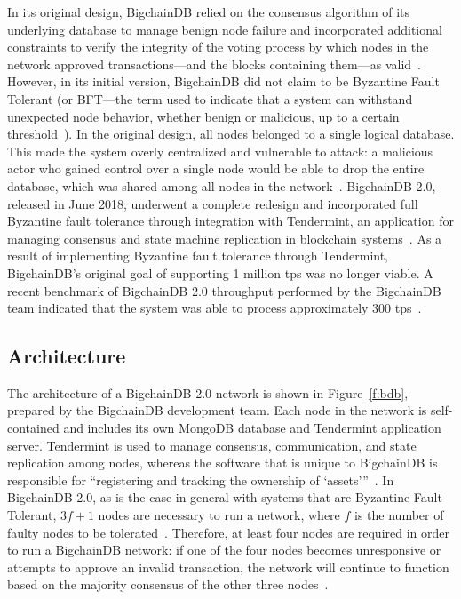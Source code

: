 In its original design, BigchainDB relied on the consensus algorithm of
its underlying database to manage benign node failure and incorporated
additional constraints to verify the integrity of the voting process by
which nodes in the network approved transactions---and the blocks containing
them---as valid~\cite{bigDB16a}. However, in its initial version, BigchainDB
did not claim to be Byzantine Fault Tolerant (or BFT---the term used to
indicate that a system can withstand unexpected node behavior, whether
benign or malicious, up to a certain threshold~\cite{bigDB16a}). In the
original design, all nodes belonged to a single logical database. This made
the system overly centralized and vulnerable to attack: a malicious actor
who gained control over a single node would be able to drop the entire
database, which was shared among all nodes in the network~\cite{ks16, bigDB18}.
BigchainDB 2.0, released in June 2018, underwent a complete redesign and
incorporated full Byzantine fault tolerance through integration with
Tendermint, an application for managing consensus and state machine
replication in blockchain systems~\cite{troyM18b, tender18}. As a result of
implementing Byzantine fault tolerance through Tendermint, BigchainDB's
original goal of supporting 1 million tps was no longer viable. A recent
benchmark of BigchainDB 2.0 throughput performed by the BigchainDB team
indicated that the system was able to process approximately 300
tps~\cite{troyM18a}.

\subsection{Architecture}
The architecture of a BigchainDB 2.0 network is shown in
Figure~\ref{f:bdb}, prepared by the BigchainDB development team. Each node
in the network is self-contained and includes its own MongoDB database and
Tendermint application server. Tendermint is used to manage consensus,
communication, and state replication among nodes, whereas the software that
is unique to BigchainDB is responsible for ``registering and tracking the
ownership of `assets'\thinspace''~\cite{troyM18b}. ﻿In BigchainDB 2.0, as is
the case in general with systems that are Byzantine Fault Tolerant, $3f + 1$
nodes are necessary to run a network, where $f$ is the number of faulty
nodes to be tolerated~\cite{bdb18}. Therefore, at least four nodes are
required in order to run a BigchainDB network: if one of the four nodes
becomes unresponsive or attempts to approve an invalid transaction, the
network will continue to function based on the majority consensus of the
other three nodes~\cite{bdb18}.

